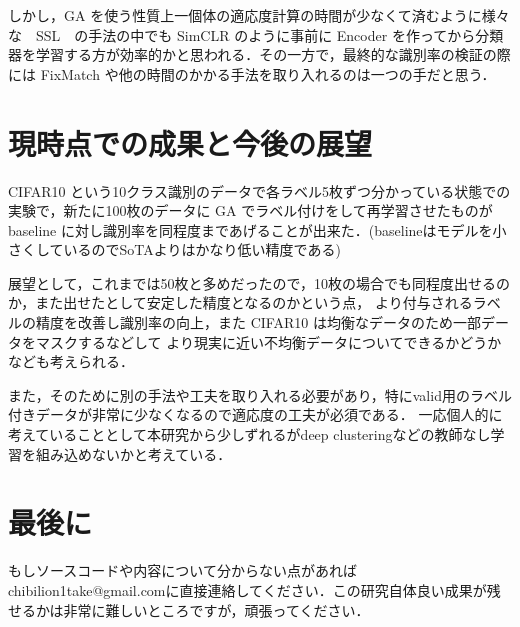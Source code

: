 \documentclass[twocolumn]{jarticle}     %
\begin{document}
しかし，GA を使う性質上一個体の適応度計算の時間が少なくて済むように様々な　SSL　の手法の中でも SimCLR のように事前に Encoder を作ってから分類器を学習する方が効率的かと思われる．その一方で，最終的な識別率の検証の際には FixMatch や他の時間のかかる手法を取り入れるのは一つの手だと思う．

\section{現時点での成果と今後の展望}
CIFAR10 という10クラス識別のデータで各ラベル5枚ずつ分かっている状態での実験で，新たに100枚のデータに GA でラベル付けをして再学習させたものが baseline に対し識別率を同程度まであげることが出来た．(baselineはモデルを小さくしているのでSoTAよりはかなり低い精度である)

展望として，これまでは50枚と多めだったので，10枚の場合でも同程度出せるのか，また出せたとして安定した精度となるのかという点，
より付与されるラベルの精度を改善し識別率の向上，また CIFAR10 は均衡なデータのため一部データをマスクするなどして
より現実に近い不均衡データについてできるかどうかなども考えられる．

また，そのために別の手法や工夫を取り入れる必要があり，特にvalid用のラベル付きデータが非常に少なくなるので適応度の工夫が必須である．
一応個人的に考えていることとして本研究から少しずれるがdeep clusteringなどの教師なし学習を組み込めないかと考えている．

\section{最後に}
もしソースコードや内容について分からない点があればchibilion1take@gmail.comに直接連絡してください．この研究自体良い成果が残せるかは非常に難しいところですが，頑張ってください．
\end{document}
